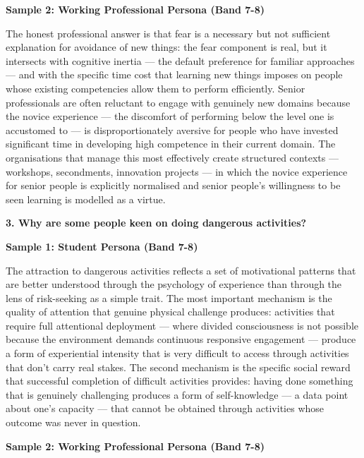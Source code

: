 \textbf{Sample 2: Working Professional Persona (Band 7-8)}

The honest professional answer is that fear is a necessary but not sufficient explanation for avoidance of new things: the fear component is real, but it intersects with cognitive inertia — the default preference for familiar approaches — and with the specific time cost that learning new things imposes on people whose existing competencies allow them to perform efficiently. Senior professionals are often reluctant to engage with genuinely new domains because the novice experience — the discomfort of performing below the level one is accustomed to — is disproportionately aversive for people who have invested significant time in developing high competence in their current domain. The organisations that manage this most effectively create structured contexts — workshops, secondments, innovation projects — in which the novice experience for senior people is explicitly normalised and senior people's willingness to be seen learning is modelled as a virtue.

\separator

\begin{ieltsquestion}
\textbf{3. Why are some people keen on doing dangerous activities?}
\end{ieltsquestion}
\textbf{Sample 1: Student Persona (Band 7-8)}

The attraction to dangerous activities reflects a set of motivational patterns that are better understood through the psychology of experience than through the lens of risk-seeking as a simple trait. The most important mechanism is the quality of attention that genuine physical challenge produces: activities that require full attentional deployment — where divided consciousness is not possible because the environment demands continuous responsive engagement — produce a form of experiential intensity that is very difficult to access through activities that don't carry real stakes. The second mechanism is the specific social reward that successful completion of difficult activities provides: having done something that is genuinely challenging produces a form of self-knowledge — a data point about one's capacity — that cannot be obtained through activities whose outcome was never in question.

\textbf{Sample 2: Working Professional Persona (Band 7-8)}

